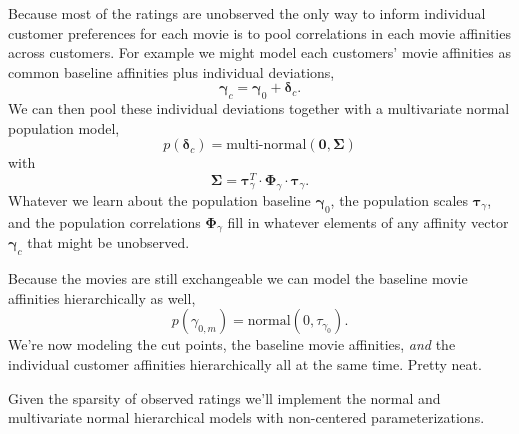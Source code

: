 \documentclass[
  letterpaper,
  DIV=11,
  numbers=noendperiod]{scrartcl}
\begin{document}
Because most of the ratings are unobserved the only way to inform
individual customer preferences for each movie is to pool correlations
in each movie affinities across customers. For example we might model
each customers' movie affinities as common baseline affinities plus
individual deviations, \[
\boldsymbol{\gamma}_{c}
=
\boldsymbol{\gamma}_{0} + \boldsymbol{\delta}_{c}.
\] We can then pool these individual deviations together with a
multivariate normal population model, \[
p(\boldsymbol{\delta}_{c})
=
\text{multi-normal}( \mathbf{0}, \boldsymbol{\Sigma} )
\] with \[
\boldsymbol{\Sigma}
=
\boldsymbol{\tau}_{\gamma}^{T} \cdot
\boldsymbol{\Phi}_{\gamma} \cdot
\boldsymbol{\tau}_{\gamma}.
\] Whatever we learn about the population baseline
\(\boldsymbol{\gamma}_{0}\), the population scales
\(\boldsymbol{\tau}_{\gamma}\), and the population correlations
\(\boldsymbol{\Phi}_{\gamma}\) fill in whatever elements of any affinity
vector \(\boldsymbol{\gamma}_{c}\) that might be unobserved.

Because the movies are still exchangeable we can model the baseline
movie affinities hierarchically as well, \[
p( \gamma_{0, m} ) = \text{normal}(0, \tau_{\gamma_{0}} ).
\] We're now modeling the cut points, the baseline movie affinities,
\emph{and} the individual customer affinities hierarchically all at the
same time. Pretty neat.

Given the sparsity of observed ratings we'll implement the normal and
multivariate normal hierarchical models with non-centered
parameterizations.
\end{document}
